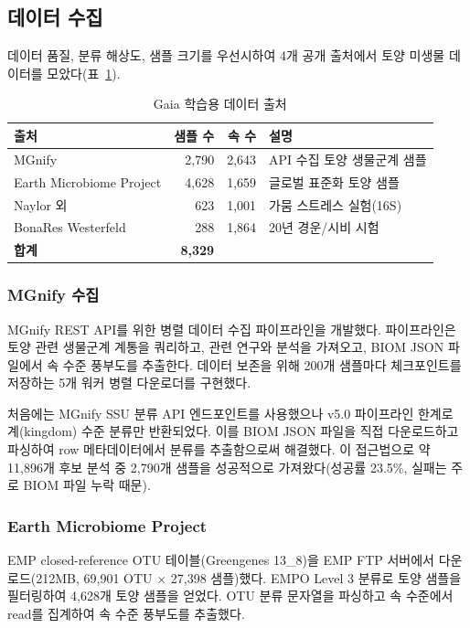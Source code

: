 \documentclass[11pt,a4paper]{article}
\begin{document}
\subsection{데이터 수집}

데이터 품질, 분류 해상도, 샘플 크기를 우선시하여 4개 공개 출처에서 토양 미생물 데이터를 모았다(표~\ref{tab:data}).

\begin{table}[H]
\centering
\caption{Gaia 학습용 데이터 출처}
\label{tab:data}
\begin{tabular}{lrrl}
\toprule
\textbf{출처} & \textbf{샘플 수} & \textbf{속 수} & \textbf{설명} \\
\midrule
MGnify & 2,790 & 2,643 & API 수집 토양 생물군계 샘플 \\
Earth Microbiome Project & 4,628 & 1,659 & 글로벌 표준화 토양 샘플 \\
Naylor 외 \citep{naylor2017drought} & 623 & 1,001 & 가뭄 스트레스 실험(16S) \\
BonaRes Westerfeld \citep{bonares2025} & 288 & 1,864 & 20년 경운/시비 시험 \\
\midrule
\textbf{합계} & \textbf{8,329} & & \\
\bottomrule
\end{tabular}
\end{table}

\subsubsection{MGnify 수집}

MGnify REST API를 위한 병렬 데이터 수집 파이프라인을 개발했다. 파이프라인은 토양 관련 생물군계 계통을 쿼리하고, 관련 연구와 분석을 가져오고, BIOM JSON 파일에서 속 수준 풍부도를 추출한다. 데이터 보존을 위해 200개 샘플마다 체크포인트를 저장하는 5개 워커 병렬 다운로더를 구현했다.

처음에는 MGnify SSU 분류 API 엔드포인트를 사용했으나 v5.0 파이프라인 한계로 계(kingdom) 수준 분류만 반환되었다. 이를 BIOM JSON 파일을 직접 다운로드하고 파싱하여 row 메타데이터에서 분류를 추출함으로써 해결했다. 이 접근법으로 약 11,896개 후보 분석 중 2,790개 샘플을 성공적으로 가져왔다(성공률 23.5\%, 실패는 주로 BIOM 파일 누락 때문).

\subsubsection{Earth Microbiome Project}

EMP closed-reference OTU 테이블(Greengenes 13\_8)을 EMP FTP 서버에서 다운로드(212MB, 69,901 OTU $\times$ 27,398 샘플)했다. EMPO Level 3 분류로 토양 샘플을 필터링하여 4,628개 토양 샘플을 얻었다. OTU 분류 문자열을 파싱하고 속 수준에서 read를 집계하여 속 수준 풍부도를 추출했다.
\end{document}
